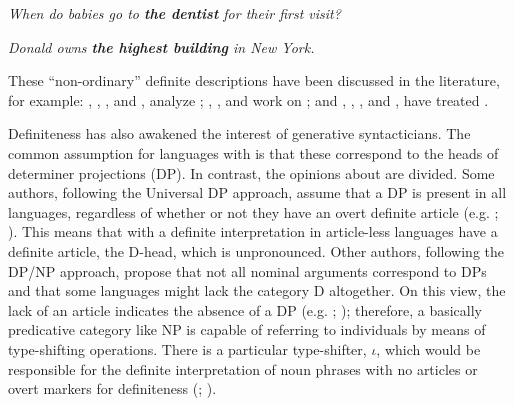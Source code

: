 \documentclass[output=paper]{langsci/langscibook}
\begin{document}
	\ex \label{ex:aguilar:1c}
	\textit{When do babies go to \textbf{the dentist} for their first visit?} %
	
	\ex \label{ex:aguilar:1d}
	\textit{Donald owns \textbf{the highest building} in New York.} %
	
	\z  
\z \newpage

These “non-ordinary” definite descriptions have been discussed in the literature, for example: \citet{Chierchia1998}, \citet{Dayal2004}, \citet{Krifka2003}, \citet{Farkas2007} and \citet{Borik2012a}, analyze ; \citet{CarlsonSussman2005}, \citet{Aguilar-GuevaraZwarsts2011,Aguilar-GuevaraZwarts2013}, \citet{Schwarz2014} and \citet{Zwarts2014} work on ; and \citet{Szabolcsi1986}, \citet{Hackl2009}, \citet{SharvitStateva2002}, \citet{Krasikova2012} and \citet{CoppockBeaver2014}, have treated .

Definiteness has also awakened the interest of generative syntacticians. The common assumption for languages with  is that these correspond to the heads of determiner projections (DP). In contrast, the opinions about  are divided. Some authors, following the Universal DP approach, assume that a DP is present in all languages, regardless of whether or not they have an overt definite article (e.g. \citealt{Cinque1994}; \citealt{Longobardi1994}). This means that  with a definite interpretation in article-less languages have a definite article, the D-head, which is unpronounced. Other authors, following the DP/NP approach, propose that not all nominal arguments correspond to DPs and that some languages might lack the category D altogether. On this view, the lack of an article indicates the absence of a DP (e.g. \citealt{Baker2003}; \citealt{Boskovic2008}); therefore, a basically predicative category like NP is capable of referring to individuals by means of type-shifting operations. There is a particular type-shifter, $\iota$, which would be responsible for the definite interpretation of noun phrases with no articles or overt markers for definiteness (\citealt{Chierchia1998}; \citealt{Dayal2004}).
\end{document}
